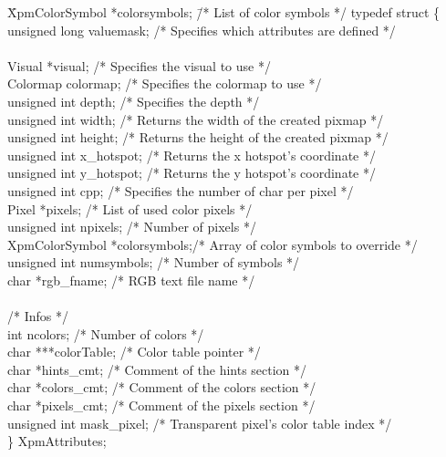 \begin{tabbing}

\hspace{1cm}\= XpmColorSymbol *colorsymbols; \=/* List of color symbols */\kill
typedef struct \{ \\
\> unsigned long valuemask;  \>/* Specifies which attributes are defined */\\
\\
\> Visual *visual;	     \>/* Specifies the visual to use */ \\
\> Colormap colormap; 	     \>/* Specifies the colormap to use */ \\
\> unsigned int depth;	     \>/* Specifies the depth */ \\
\> unsigned int width;	     \>/* Returns the width of the created pixmap */\\
\> unsigned int height;      \>/* Returns the height of the created pixmap */\\
\> unsigned int x\_hotspot;  \>/* Returns the x hotspot's coordinate */\\
\> unsigned int y\_hotspot;  \>/* Returns the y hotspot's coordinate */ \\
\> unsigned int cpp; 	     \>/* Specifies the number of char per pixel */ \\
\> Pixel *pixels; 	     \>/* List of used color pixels */ \\
\> unsigned int npixels;     \>/* Number of pixels */\\
\> XpmColorSymbol *colorsymbols;\>/* Array of color symbols to override */ \\
\> unsigned int numsymbols;  \>/* Number of symbols */ \\
\> char *rgb\_fname;	     \>/* RGB text file name */ \\
\\
\> /* Infos */  \\
\> int ncolors;		     \>/* Number of colors */ \\
\> char ***colorTable; 	     \>/* Color table pointer */ \\
\> char *hints\_cmt; 	     \>/* Comment of the hints section */ \\
\> char *colors\_cmt;	     \>/* Comment of the colors section */ \\
\> char *pixels\_cmt;	     \>/* Comment of the pixels section */ \\
\> unsigned int mask\_pixel; \>/* Transparent pixel's color table index */\\
\} XpmAttributes;

\end{tabbing}

